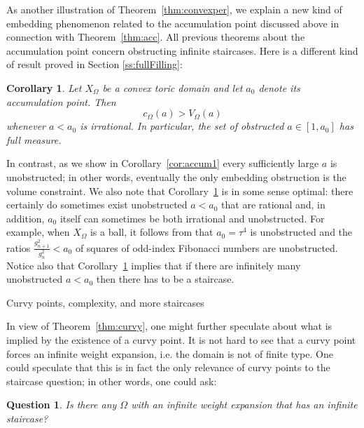 \documentclass[11pt, reqno]{amsart}
\makeatletter
\def\subsection{\@startsection{subsection}{2}%
  \z@{.75\linespacing\@plus.7\linespacing}{-.5em}%
  {\normalfont\large\bfseries}}
\newtheorem{cor}[thm]{Corollary}
\newtheorem{question}[thm]{Question}
\theoremstyle{remark}
\numberwithin{equation}{subsection}
\numberwithin{figure}{section}
\theoremstyle{customremark}
\newcommand{\Om}{{\Omega}}
\makeatother
\begin{document}
As another illustration of Theorem~\ref{thm:convexper}, we explain a new kind of embedding phenomenon related to the accumulation point discussed above in connection with Theorem~\ref{thm:acc}.  All previous theorems about the accumulation point concern obstructing infinite staircases.  Here is a different kind of result proved in Section \ref{ss:fullFilling}:

\begin{cor}
\label{cor:new}
Let $X_{\Omega}$ be a convex toric domain and let $a_0$ denote its accumulation point.  Then 
\[ c_\Om(a) > V_\Om(a)\]
whenever $a < a_0$ is irrational.  In particular, the set of obstructed $a \in [1, a_0]$ has full measure.  
\end{cor}


In contrast, as we show in Corollary~\ref{cor:accum1} every sufficiently large $a$ is unobstructed; in other words, eventually the only embedding obstruction is the volume constraint.
 We also note that Corollary~\ref{cor:new} is in some sense optimal: there certainly do sometimes exist unobstructed $a < a_0$ that are rational and, in addition, $a_0$ itself can sometimes be both irrational and unobstructed.  For example, when $X_{\Omega}$ is a ball, it follows from \cite{ball} that $a_0 = \tau^4$ is unobstructed and the ratios $\frac{g^2_{n+1}}{g^2_n} < a_0$ of squares of odd-index Fibonacci numbers are unobstructed. Notice also that Corollary~\ref{cor:new} implies that if there are infinitely many unobstructed $a< a_0$ then there has to be a staircase.
 




\subsection{Curvy points, complexity, and more staircases}

In view of Theorem~\ref{thm:curvy}, one might further speculate about what is implied by the existence of a curvy point. 
It is not hard to see that a curvy point forces an infinite weight expansion, i.e. the domain is not of  finite type.  One could speculate that this is in fact the only relevance of curvy points to the staircase question; in other words, one could ask:

\begin{question}
\label{que:infstar}
Is there any $\Om$ with an infinite weight expansion that has an infinite staircase?
\end{question}
\end{document}
